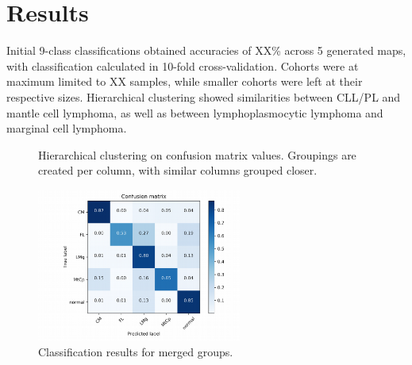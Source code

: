 \documentclass[11pt,a4paper]{article}
\begin{document}


\section{Results}

Initial 9-class classifications obtained accuracies of XX\% across 5 generated maps, with classification calculated in 10-fold cross-validation. Cohorts were at maximum limited to XX samples, while smaller cohorts were left at their respective sizes.
Hierarchical clustering showed similarities between CLL/PL and mantle cell lymphoma, as well as between lymphoplasmocytic lymphoma and marginal cell lymphoma.


\begin{figure}
   \centering
   \caption{Hierarchical clustering on confusion matrix values. Groupings are created per column, with similar columns grouped closer.}
\end{figure}



\begin{figure}
   \centering
   \includegraphics[width=0.6\textwidth]{classification}
   \caption{Classification results for merged groups.}
\end{figure}
\end{document}
